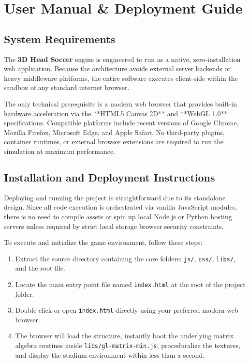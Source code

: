\chapter{User Manual \& Deployment Guide}

\section{System Requirements}
The \textbf{3D Head Soccer} engine is engineered to run as a native, zero-installation web application. Because the architecture avoids external server backends or heavy middleware platforms, the entire software executes client-side within the sandbox of any standard internet browser.

The only technical prerequisite is a modern web browser that provides built-in hardware acceleration via the **HTML5 Canvas 2D** and **WebGL 1.0** specifications. Compatible platforms include recent versions of Google Chrome, Mozilla Firefox, Microsoft Edge, and Apple Safari. No third-party plugins, container runtimes, or external browser extensions are required to run the simulation at maximum performance.

\section{Installation and Deployment Instructions}
Deploying and running the project is straightforward due to its standalone design. Since all code execution is orchestrated via vanilla JavaScript modules, there is no need to compile assets or spin up local Node.js or Python hosting servers unless required by strict local storage browser security constraints.

To execute and initialize the game environment, follow these steps:
\begin{enumerate}
    \item Extract the source directory containing the core folders: \texttt{js/}, \texttt{css/}, \texttt{libs/}, and the root file.
    \item Locate the main entry point file named \texttt{index.html} at the root of the project folder.
    \item Double-click or open \texttt{index.html} directly using your preferred modern web browser.
    \item The browser will load the structure, instantly boot the underlying matrix algebra routines inside \texttt{libs/gl-matrix-min.js}, proceduralize the textures, and display the stadium environment within less than a second.
\end{enumerate}

